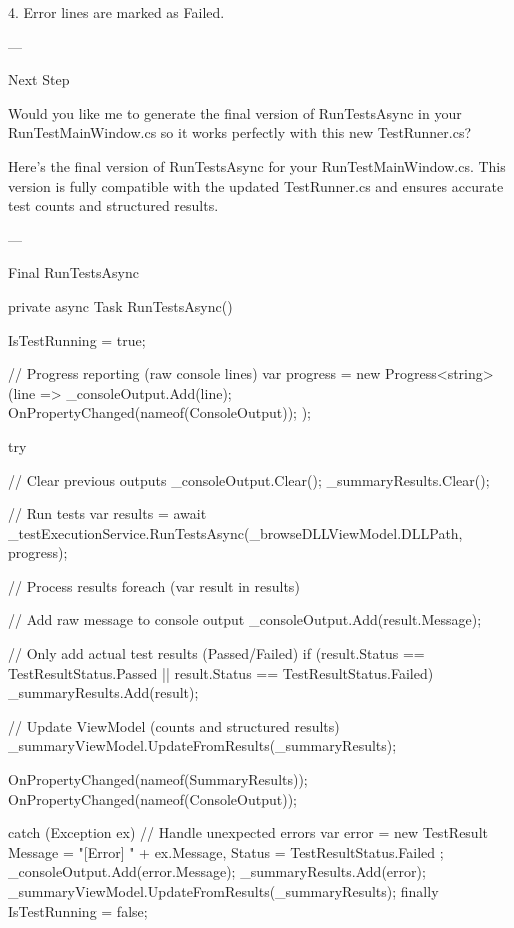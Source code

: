 4. Error lines are marked as Failed.




---

Next Step

Would you like me to generate the final version of RunTestsAsync in your RunTestMainWindow.cs so it works perfectly with this new TestRunner.cs?



Here’s the final version of RunTestsAsync for your RunTestMainWindow.cs.
This version is fully compatible with the updated TestRunner.cs and ensures accurate test counts and structured results.


---

Final RunTestsAsync

private async Task RunTestsAsync()
{
    IsTestRunning = true;

    // Progress reporting (raw console lines)
    var progress = new Progress<string>(line =>
    {
        _consoleOutput.Add(line);
        OnPropertyChanged(nameof(ConsoleOutput));
    });

    try
    {
        // Clear previous outputs
        _consoleOutput.Clear();
        _summaryResults.Clear();

        // Run tests
        var results = await _testExecutionService.RunTestsAsync(_browseDLLViewModel.DLLPath, progress);

        // Process results
        foreach (var result in results)
        {
            // Add raw message to console output
            _consoleOutput.Add(result.Message);

            // Only add actual test results (Passed/Failed)
            if (result.Status == TestResultStatus.Passed || result.Status == TestResultStatus.Failed)
            {
                _summaryResults.Add(result);
            }
        }

        // Update ViewModel (counts and structured results)
        _summaryViewModel.UpdateFromResults(_summaryResults);

        OnPropertyChanged(nameof(SummaryResults));
        OnPropertyChanged(nameof(ConsoleOutput));
    }
    catch (Exception ex)
    {
        // Handle unexpected errors
        var error = new TestResult
        {
            Message = "[Error] " + ex.Message,
            Status = TestResultStatus.Failed
        };
        _consoleOutput.Add(error.Message);
        _summaryResults.Add(error);
        _summaryViewModel.UpdateFromResults(_summaryResults);
    }
    finally
    {
        IsTestRunning = false;
    }
}


